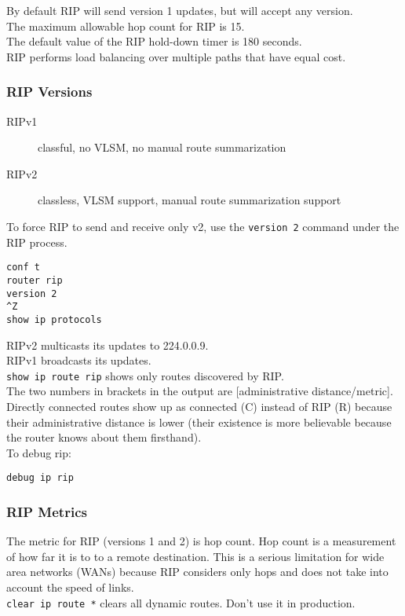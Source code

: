 By default RIP will send version 1 updates, but will accept any version.\\

The maximum allowable hop count for RIP is 15.\\

The default value of the RIP hold-down timer is 180 seconds.\\

RIP performs load balancing over multiple paths that have equal cost.

\subsubsection{RIP Versions}

\begin{description}
\item[RIPv1]
classful, no VLSM, no manual route summarization
\item[RIPv2]
classless, VLSM support, manual route summarization support
\end{description}

To force RIP to send and receive only v2, use the \texttt{version 2}
command under the RIP process.

\begin{verbatim}
conf t
router rip
version 2
^Z
show ip protocols
\end{verbatim}

RIPv2 multicasts its updates to 224.0.0.9.\\

RIPv1 broadcasts its updates.\\

\texttt{show ip route rip} shows only routes discovered by RIP.\\

The two numbers in brackets in the output are [administrative distance/metric].\\

Directly connected routes show up as connected (C) instead of RIP (R) because
their administrative distance is lower (their existence is more believable
because the router knows about them firsthand).\\

To debug rip:

\begin{verbatim}
debug ip rip  
\end{verbatim}

\subsubsection{RIP Metrics}

The metric for RIP (versions 1 and 2) is hop count. Hop count is a measurement
of how far it is to to a remote destination. This is a serious limitation for
wide area networks (WANs) because RIP considers only hops and does not take
into account the speed of links.\\

\texttt{clear ip route *} clears all dynamic routes. Don't use it in
production.
